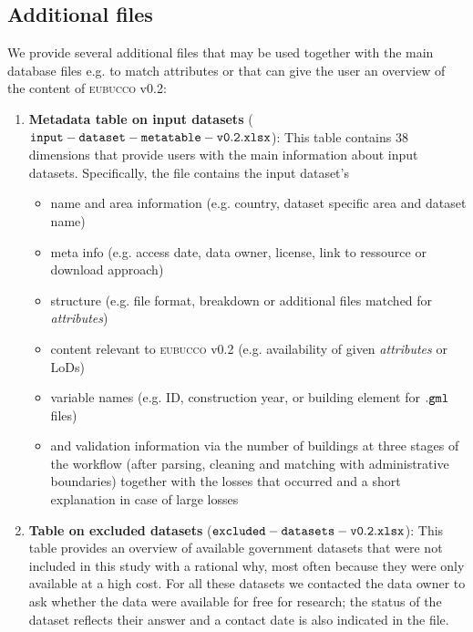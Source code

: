 \documentclass[fleqn,10pt]{wlscirep}
\begin{document}
\subsection*{Additional files}
We provide several additional files that may be used together with the main database files e.g. to match attributes or that can give the user an overview of the content of \textsc{eubucco} v0.2: 


\begin{enumerate}[topsep=1pt]

     \itemsep-0.05em 
    
    \item \textbf{Metadata table on input datasets} (${\tt input-dataset-metatable-v0.2.xlsx}$): This table contains 38 dimensions that provide users with the main information about input datasets. Specifically, the file contains the input dataset's
    
    \begin{itemize}[topsep=1pt]
        \itemsep-0.05em  
        \item name and area information (e.g. country, dataset specific area and dataset name)
        \item meta info (e.g. access date, data owner, license, link to ressource or download approach)
        \item structure (e.g. file format, breakdown or additional files matched for \textit{attributes})
        \item content relevant to \textsc{eubucco} v0.2 (e.g. availability of given \textit{attributes} or LoDs)
        \item variable names (e.g. ID, construction year, or building element for ${\tt .gml}$ files)
        \item and validation information via the number of buildings at three stages of the workflow (after parsing, cleaning and matching with administrative boundaries) together with the losses that occurred and a short explanation in case of large losses
    \end{itemize}

    \item \textbf{Table on excluded datasets} (${\tt excluded-datasets-v0.2.xlsx}$): This table provides an overview of available government datasets that were not included in this study with a rational why, most often because they were only available at a high cost. For all these datasets we contacted the data owner to ask whether the data were available for free for research; the status of the dataset reflects their answer and a contact date is also indicated in the file.  
    

\end{enumerate}
\end{document}
